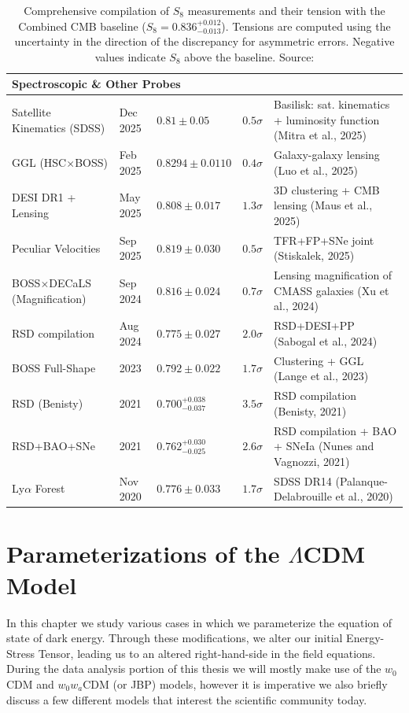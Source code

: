 \documentclass{book}
\begin{document}
\begin{table}[htbp]
\begin{tabularx}{\textwidth}{lll c X}
			\multicolumn{5}{l}{\textbf{Spectroscopic \& Other Probes}} \\ \hline
			Satellite Kinematics (SDSS) & Dec 2025 & $0.81 \pm 0.05$ & $0.5\sigma$ & Basilisk: sat. kinematics + luminosity function (Mitra et al., 2025) \\
			GGL (HSC$\times$BOSS) & Feb 2025 & $0.8294 \pm 0.0110$ & $0.4\sigma$ & Galaxy-galaxy lensing (Luo et al., 2025) \\
			DESI DR1 + Lensing & May 2025 & $0.808 \pm 0.017$ & $1.3\sigma$ & 3D clustering + CMB lensing (Maus et al., 2025) \\
			Peculiar Velocities & Sep 2025 & $0.819 \pm 0.030$ & $0.5\sigma$ & TFR+FP+SNe joint (Stiskalek, 2025) \\
			BOSS$\times$DECaLS (Magnification) & Sep 2024 & $0.816 \pm 0.024$ & $0.7\sigma$ & Lensing magnification of CMASS galaxies (Xu et al., 2024) \\
			RSD compilation & Aug 2024 & $0.775 \pm 0.027$ & $2.0\sigma$ & RSD+DESI+PP (Sabogal et al., 2024) \\
			BOSS Full-Shape & 2023 & $0.792 \pm 0.022$ & $1.7\sigma$ & Clustering + GGL (Lange et al., 2023) \\
			RSD (Benisty) & 2021 & $0.700_{-0.037}^{+0.038}$ & $3.5\sigma$ & RSD compilation (Benisty, 2021) \\
			RSD+BAO+SNe & 2021 & $0.762_{-0.025}^{+0.030}$ & $2.6\sigma$ & RSD compilation + BAO + SNeIa (Nunes and Vagnozzi, 2021) \\
			Ly$\alpha$ Forest & Nov 2020 & $0.776 \pm 0.033$ & $1.7\sigma$ & SDSS DR14 (Palanque-Delabrouille et al., 2020) \\ \hline\hline
			
		\end{tabularx}
		\normalsize
		
		\caption{Comprehensive compilation of $S_8$ measurements and their tension with the Combined CMB baseline ($S_8 = 0.836_{-0.013}^{+0.012}$). Tensions are computed using the uncertainty in the direction of the discrepancy for asymmetric errors. Negative values indicate $S_8$ above the baseline. Source: \cite{Pantos_2026}} 
		\label{tab:s8_measurements}
	\end{table}
	
	
	\chapter{Parameterizations of the $\Lambda$CDM Model}
	In this chapter we study various cases in which we parameterize the equation of state of dark energy. Through these modifications, we alter our initial Energy-Stress Tensor, leading us to an altered right-hand-side in the field equations. During the data analysis portion of this thesis we will mostly make use of the $w_0$CDM and $w_0w_a$CDM (or JBP) models, however it is imperative  we also briefly discuss a few different models that interest the scientific community today.
\end{document}

